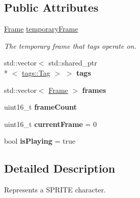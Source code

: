 \subsection*{Public Attributes}
\begin{DoxyCompactItemize}
\item 
\hyperlink{classjswf_1_1flash_1_1_frame}{Frame} \hyperlink{classjswf_1_1flash_1_1_sprite_aaef02bf73bbb9cb5120e06e32711c2e2}{temporary\+Frame}
\begin{DoxyCompactList}\small\item\em The temporary frame that tags operate on. \end{DoxyCompactList}\item 
\hypertarget{classjswf_1_1flash_1_1_sprite_a2d38f83b8bb09d582f6fc467979c0293}{std\+::vector$<$ std\+::shared\+\_\+ptr\\*
$<$ \hyperlink{classjswf_1_1flash_1_1tags_1_1_tag}{tags\+::\+Tag} $>$ $>$ {\bfseries tags}}\label{classjswf_1_1flash_1_1_sprite_a2d38f83b8bb09d582f6fc467979c0293}

\item 
\hypertarget{classjswf_1_1flash_1_1_sprite_a7b2c5ad336b0622e61ca01ace51945a1}{std\+::vector$<$ \hyperlink{classjswf_1_1flash_1_1_frame}{Frame} $>$ {\bfseries frames}}\label{classjswf_1_1flash_1_1_sprite_a7b2c5ad336b0622e61ca01ace51945a1}

\item 
\hypertarget{classjswf_1_1flash_1_1_sprite_a90e20331668e9d77a497649c9f56ed75}{uint16\+\_\+t {\bfseries frame\+Count}}\label{classjswf_1_1flash_1_1_sprite_a90e20331668e9d77a497649c9f56ed75}

\item 
\hypertarget{classjswf_1_1flash_1_1_sprite_a110fc93f5f1fe5a514ab23be7e1f7c2e}{uint16\+\_\+t {\bfseries current\+Frame} = 0}\label{classjswf_1_1flash_1_1_sprite_a110fc93f5f1fe5a514ab23be7e1f7c2e}

\item 
\hypertarget{classjswf_1_1flash_1_1_sprite_ad45454b41d306513ec825776900d3f42}{bool {\bfseries is\+Playing} = true}\label{classjswf_1_1flash_1_1_sprite_ad45454b41d306513ec825776900d3f42}

\end{DoxyCompactItemize}


\subsection{Detailed Description}
Represents a {\ttfamily S\+P\+R\+I\+T\+E} character. 

